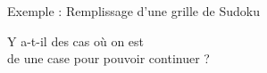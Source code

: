 \begin{frame}{Exemple : Remplissage d'une grille de Sudoku}
  \begin{center}
    \alert{
      Y a-t-il des cas où on est  \\ de  une case pour pouvoir continuer ?  
    }
  \end{center}

\end{frame}

\endgroup
\endinput
